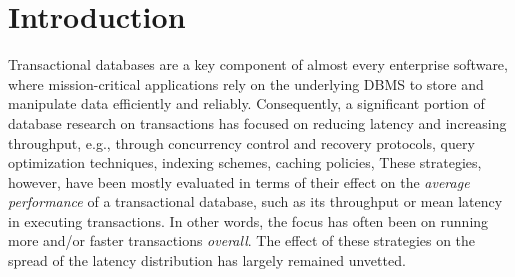 
\section{Introduction}
\label{sec:intro}

Transactional databases are a key component of almost every enterprise software, where 
mission-critical applications rely on the underlying DBMS to store and manipulate data efficiently and reliably. 
Consequently, a significant portion of database research on transactions has focused on reducing latency and 
increasing  throughput, e.g.,  through
 concurrency control and recovery protocols, query optimization techniques, indexing schemes, 
 caching policies,  
These strategies, however, have been mostly evaluated  in terms of
 their effect on the \emph{average performance} of a transactional database, such as its throughput 
 or mean latency in executing transactions. 
 In other words, the focus has often been on running more and/or faster transactions \emph{overall}.
The effect of these strategies on the spread of the latency distribution has largely remained unvetted.


